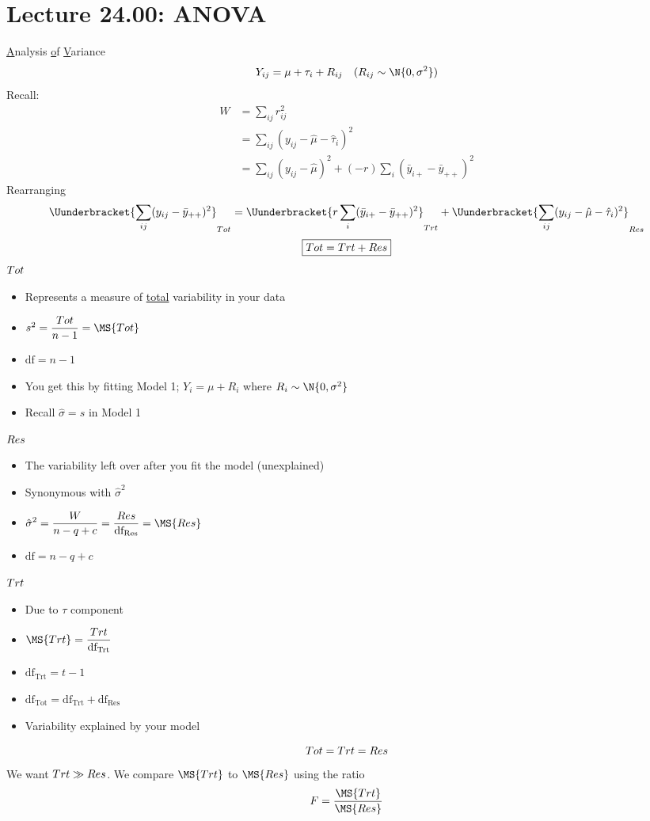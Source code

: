 \section{Lecture 24.00: ANOVA}
\underline{A}nalysis \underline{o}f \underline{V}ariance
\[ Y_{ij}=\mu+\tau_i+R_{ij}\quad(R_{ij}\sim \N{0,\sigma^2}) \]
Recall:
\begin{align*}
    W
     & =\sum_{ij}r_{ij}^2                                                       \\
     & =\sum_{ij}(y_{ij}-\hat{\mu}-\hat{\tau}_i)^2                              \\
     & =\sum_{ij}(y_{ij}-\hat{\mu})^2+(-r)\sum_{i}(\bar{y}_{i+}-\bar{y}_{++})^2
\end{align*}
Rearranging
\[ \Uunderbracket{\sum_{ij}(y_{ij}-\bar{y}_{++})^2}_{\SS{Tot}}
    =\Uunderbracket{r \sum_{i}(\bar{y}_{i+}-\bar{y}_{++})^2}_{\SS{Trt}}+
    \Uunderbracket{\sum_{ij}(y_{ij}-\hat{\mu}-\hat{\tau}_i)^2}_{\SS{Res}}   \]
\[ \boxed{\relax{Tot}=\relax{Trt}+\relax{Res}} \]
$ \relax{Tot} $
\begin{itemize}
    \item Represents a measure of \underline{total}
          variability in your data
    \item $ s^2=\dfrac{\SS{Tot}}{n-1}=\MS{Tot} $
    \item $ \text{df}=n-1 $
    \item You get this by fitting Model 1; $ Y_{i}=\mu+R_{i} $
          where $ R_i \sim \N{0,\sigma^2} $
    \item Recall $ \hat{\sigma}=s $ in Model 1
\end{itemize}
$ \relax{Res} $
\begin{itemize}
    \item The variability left over after you fit the model (unexplained)
    \item Synonymous with $ \hat{\sigma}^2 $
    \item $ \displaystyle \hat{\sigma}^2=\frac{W}{n-q+c} =\frac{\SS{Res}}{\text{df}_{\text{Res}}}=\MS{Res} $
    \item $ \text{df}=n-q+c $
\end{itemize}
$ \relax{Trt} $
\begin{itemize}
    \item Due to $ \tau $ component
    \item $ \MS{Trt}=\dfrac{\SS{Trt}}{\text{df}_{\text{Trt}}} $
    \item $ \text{df}_{\text{Trt}}=t-1 $
    \item $ \boxed{\text{df}_{\text{Tot}}=\text{df}_{\text{Trt}}+\text{df}_{\text{Res}}} $
    \item Variability explained by your model
\end{itemize}
\[ \relax{Tot}=\relax{Trt}=\relax{Res} \]
We want $ \relax{Trt}\gg \relax{Res} $. We compare
$ \MS{Trt} $ to $ \MS{Res} $ using the ratio
\[ F=\frac{\MS{Trt}}{\MS{Res}} \]
